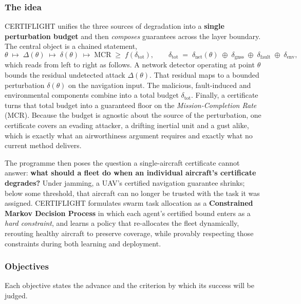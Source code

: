 \documentclass[11pt,a4paper]{article}
\begin{document}
\subsubsection{The idea}
CERTIFLIGHT unifies the three sources of degradation into a \textbf{single perturbation budget} and then \emph{composes} guarantees across the layer boundary. The central object is a chained statement,
\[
\theta \;\longmapsto\; \Delta(\theta) \;\longmapsto\; \delta(\theta) \;\longmapsto\; \mathrm{MCR} \;\ge\; f\!\left(\delta_{\text{tot}}\right),
\qquad
\delta_{\text{tot}} \;=\; \delta_{\text{net}}(\theta) \;\oplus\; \delta_{\text{gnss}} \;\oplus\; \delta_{\text{fault}} \;\oplus\; \delta_{\text{env}},
\]
which reads from left to right as follows. A network detector operating at point $\theta$ bounds the residual undetected attack $\Delta(\theta)$. That residual maps to a bounded perturbation $\delta(\theta)$ on the navigation input. The malicious, fault-induced and environmental components combine into a total budget $\delta_{\text{tot}}$. Finally, a certificate turns that total budget into a guaranteed floor on the \emph{Mission-Completion Rate} (MCR). Because the budget is agnostic about the source of the perturbation, one certificate covers an evading attacker, a drifting inertial unit and a gust alike, which is exactly what an airworthiness argument requires and exactly what no current method delivers.

The programme then poses the question a single-aircraft certificate cannot answer: \textbf{what should a fleet do when an individual aircraft's certificate degrades?} Under jamming, a UAV's certified navigation guarantee shrinks; below some threshold, that aircraft can no longer be trusted with the task it was assigned. CERTIFLIGHT formulates swarm task allocation as a \textbf{Constrained Markov Decision Process} in which each agent's certified bound enters as a \emph{hard constraint}, and learns a policy that re-allocates the fleet dynamically, rerouting healthy aircraft to preserve coverage, while provably respecting those constraints during both learning and deployment.

\subsubsection{Objectives}
Each objective states the advance and the criterion by which its success will be judged.
\end{document}
